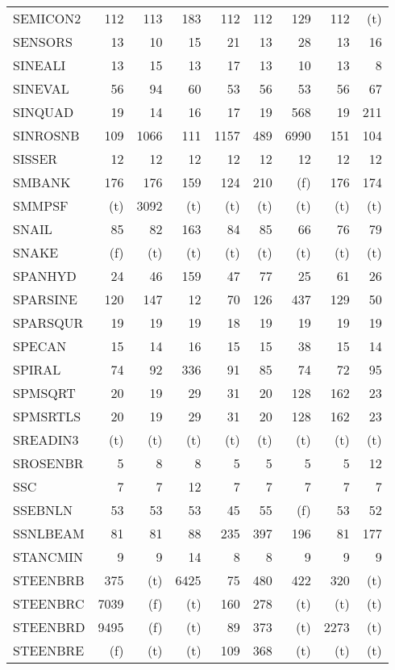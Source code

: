 \documentclass[11pt,twoside]{article}
\begin{document}
{\begin{longtable}[c]{|l|r|r|r|r|r|r|r|r|}
 SEMICON2 & 112 & 113 & 183 & 112 & 112 & 129 & 112 & (t) \\
 SENSORS & 13 & 10 & 15 & 21 & 13 & 28 & 13 & 16 \\
 SINEALI & 13 & 15 & 13 & 17 & 13 & 10 & 13 & 8 \\
 SINEVAL & 56 & 94 & 60 & 53 & 56 & 53 & 56 & 67 \\
 SINQUAD & 19 & 14 & 16 & 17 & 19 & 568 & 19 & 211 \\
 SINROSNB & 109 & 1066 & 111 & 1157 & 489 & 6990 & 151 & 104 \\
 SISSER & 12 & 12 & 12 & 12 & 12 & 12 & 12 & 12 \\
 SMBANK & 176 & 176 & 159 & 124 & 210 & (f) & 176 & 174 \\
 SMMPSF & (t) & 3092 & (t) & (t) & (t) & (t) & (t) & (t) \\
 SNAIL & 85 & 82 & 163 & 84 & 85 & 66 & 76 & 79 \\
 SNAKE & (f) & (t) & (t) & (t) & (t) & (t) & (t) & (t) \\
 SPANHYD & 24 & 46 & 159 & 47 & 77 & 25 & 61 & 26 \\
 SPARSINE & 120 & 147 & 12 & 70 & 126 & 437 & 129 & 50 \\
 SPARSQUR & 19 & 19 & 19 & 18 & 19 & 19 & 19 & 19 \\
 SPECAN & 15 & 14 & 16 & 15 & 15 & 38 & 15 & 14 \\
 SPIRAL & 74 & 92 & 336 & 91 & 85 & 74 & 72 & 95 \\
 SPMSQRT & 20 & 19 & 29 & 31 & 20 & 128 & 162 & 23 \\
 SPMSRTLS & 20 & 19 & 29 & 31 & 20 & 128 & 162 & 23 \\
 SREADIN3 & (t) & (t) & (t) & (t) & (t) & (t) & (t) & (t) \\
 SROSENBR & 5 & 8 & 8 & 5 & 5 & 5 & 5 & 12 \\
 SSC & 7 & 7 & 12 & 7 & 7 & 7 & 7 & 7 \\
 SSEBNLN & 53 & 53 & 53 & 45 & 55 & (f) & 53 & 52 \\
 SSNLBEAM & 81 & 81 & 88 & 235 & 397 & 196 & 81 & 177 \\
 STANCMIN & 9 & 9 & 14 & 8 & 8 & 9 & 9 & 9 \\
 STEENBRB & 375 & (t) & 6425 & 75 & 480 & 422 & 320 & (t) \\
 STEENBRC & 7039 & (f) & (t) & 160 & 278 & (t) & (t) & (t) \\
 STEENBRD & 9495 & (f) & (t) & 89 & 373 & (t) & 2273 & (t) \\
 STEENBRE & (f) & (t) & (t) & 109 & 368 & (t) & (t) & (t) \\

\end{longtable}}
\end{document}
